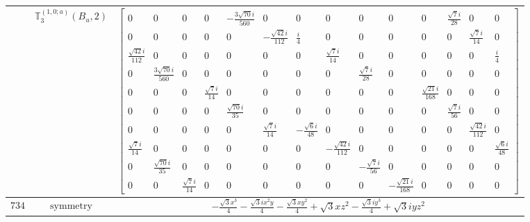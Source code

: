 \documentclass[fleqn,8pt,landscape]{jsarticle}
\begin{document}
\begin{longtable}{ccc}
$  $ & $ \mathbb{T}_{3}^{(1,0;a)}(B_{u},2) $ & $ \begin{bmatrix} 0 & 0 & 0 & 0 & - \frac{3 \sqrt{70} i}{560} & 0 & 0 & 0 & 0 & 0 & 0 & \frac{\sqrt{7} i}{28} & 0 & 0 \\ 0 & 0 & 0 & 0 & 0 & - \frac{\sqrt{42} i}{112} & \frac{i}{4} & 0 & 0 & 0 & 0 & 0 & \frac{\sqrt{7} i}{14} & 0 \\ \frac{\sqrt{42} i}{112} & 0 & 0 & 0 & 0 & 0 & 0 & \frac{\sqrt{7} i}{14} & 0 & 0 & 0 & 0 & 0 & \frac{i}{4} \\ 0 & \frac{3 \sqrt{70} i}{560} & 0 & 0 & 0 & 0 & 0 & 0 & \frac{\sqrt{7} i}{28} & 0 & 0 & 0 & 0 & 0 \\ 0 & 0 & 0 & \frac{\sqrt{7} i}{14} & 0 & 0 & 0 & 0 & 0 & 0 & \frac{\sqrt{21} i}{168} & 0 & 0 & 0 \\ 0 & 0 & 0 & 0 & \frac{\sqrt{70} i}{35} & 0 & 0 & 0 & 0 & 0 & 0 & \frac{\sqrt{7} i}{56} & 0 & 0 \\ 0 & 0 & 0 & 0 & 0 & \frac{\sqrt{7} i}{14} & - \frac{\sqrt{6} i}{48} & 0 & 0 & 0 & 0 & 0 & \frac{\sqrt{42} i}{112} & 0 \\ \frac{\sqrt{7} i}{14} & 0 & 0 & 0 & 0 & 0 & 0 & - \frac{\sqrt{42} i}{112} & 0 & 0 & 0 & 0 & 0 & \frac{\sqrt{6} i}{48} \\ 0 & \frac{\sqrt{70} i}{35} & 0 & 0 & 0 & 0 & 0 & 0 & - \frac{\sqrt{7} i}{56} & 0 & 0 & 0 & 0 & 0 \\ 0 & 0 & \frac{\sqrt{7} i}{14} & 0 & 0 & 0 & 0 & 0 & 0 & - \frac{\sqrt{21} i}{168} & 0 & 0 & 0 & 0 \end{bmatrix} $ \\ \hline
$ 734 $ & $ \text{symmetry} $ & $ - \frac{\sqrt{3} x^{3}}{4} - \frac{\sqrt{3} i x^{2} y}{4} - \frac{\sqrt{3} x y^{2}}{4} + \sqrt{3} x z^{2} - \frac{\sqrt{3} i y^{3}}{4} + \sqrt{3} i y z^{2} $ \\

\end{longtable}
\end{document}
